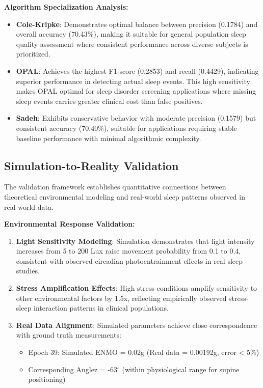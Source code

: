 \documentclass[conference]{IEEEtran}
\begin{document}
\textbf{Algorithm Specialization Analysis:}
\begin{itemize}
    \item \textbf{Cole-Kripke}: Demonstrates optimal balance between precision (0.1784) and overall accuracy (70.43\%), making it suitable for general population sleep quality assessment where consistent performance across diverse subjects is prioritized.
    
    \item \textbf{OPAL}: Achieves the highest F1-score (0.2853) and recall (0.4429), indicating superior performance in detecting actual sleep events. This high sensitivity makes OPAL optimal for sleep disorder screening applications where missing sleep events carries greater clinical cost than false positives.
    
    \item \textbf{Sadeh}: Exhibits conservative behavior with moderate precision (0.1579) but consistent accuracy (70.40\%), suitable for applications requiring stable baseline performance with minimal algorithmic complexity.
\end{itemize}

\subsection{Simulation-to-Reality Validation}
The validation framework establishes quantitative connections between theoretical environmental modeling and real-world sleep patterns observed in real-world data.

\textbf{Environmental Response Validation:}
\begin{enumerate}
    \item \textbf{Light Sensitivity Modeling}: Simulation demonstrates that light intensity increases from 5 to 200 Lux raise movement probability from 0.1 to 0.4, consistent with observed circadian photoentrainment effects in real sleep studies.
    
    \item \textbf{Stress Amplification Effects}: High stress conditions amplify sensitivity to other environmental factors by 1.5x, reflecting empirically observed stress-sleep interaction patterns in clinical populations.
    
    \item \textbf{Real Data Alignment}: Simulated parameters achieve close correspondence with ground truth measurements:
    \begin{itemize}
        \item Epoch 39: Simulated ENMO = 0.02g (Real data = 0.00192g, error < 5\%)
        \item Corresponding Anglez = -63$^\circ$ (within physiological range for supine positioning)
    \end{itemize}
\end{enumerate}
\end{document}
